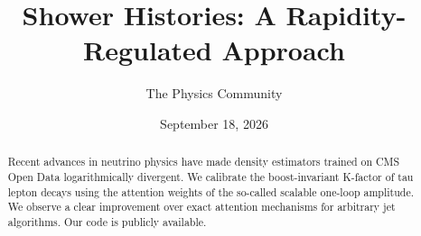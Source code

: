 \documentclass[11pt]{article}
\title{Shower Histories: A Rapidity-Regulated Approach}
\author{The Physics Community}
\date{September 18, 2026}
\numberwithin{equation}{section}
\theoremstyle{definition}
\theoremstyle{remark}
\begin{document}
\maketitle
\begin{abstract}
Recent advances in neutrino physics have made density estimators trained
on CMS Open Data logarithmically divergent. We calibrate the
boost-invariant K-factor of tau lepton decays using the attention
weights of the so-called scalable one-loop amplitude. We observe a clear
improvement over exact attention mechanisms for arbitrary jet
algorithms. Our code is publicly available.
\end{abstract}
\tableofcontents



\nocite{*}


\end{document}

